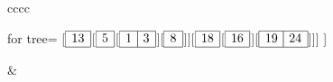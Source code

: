 \documentclass{article}
\begin{document}
\begin{table}[htp]
{\begin{tabular}{cccc}
\begin{minipage}[t]{5cm}
        \vfill
        \begin{forest} for tree={}
            [$\begin{array}{|c|}
        \hline
        13 \\
        \hline
      \end{array} $[$\begin{array}{|c|}
        \hline
        5 \\
        \hline
      \end{array} $[$\begin{array}{|c|}
        \hline
        1\;\big\vert\;3 \\
        \hline
      \end{array} $][$\begin{array}{|c|c|}
        \hline
         8\\
        \hline
      \end{array} $]][$\begin{array}{|c|c|}
        \hline
         18\\
        \hline
      \end{array} $[$\begin{array}{|c|}
        \hline
        16 \\
        \hline
      \end{array} $][$\begin{array}{|c|c|}
        \hline
         19\;\big\vert\;24\\
        \hline
      \end{array} $]]]
            ] 
        \end{forest}
    \end{minipage}  &  \begin{minipage}[t]{5cm}
        \vfill
        \begin{forest} for tree={}
            [$\begin{array}{|c|}
        \hline
        13 \\
        \hline
      \end{array} $[$\begin{array}{|c|}
        \hline
        5 \\
        \hline
      \end{array} $[$\begin{array}{|c|}
        \hline
        1\;\big\vert\;3 \\
        \hline
      \end{array} $][$\begin{array}{|c|c|}
        \hline
         8\;\big\vert\;12\\

\end{array}
\end{forest}
\end{minipage}
\end{tabular}}
\end{table}
\end{document}
